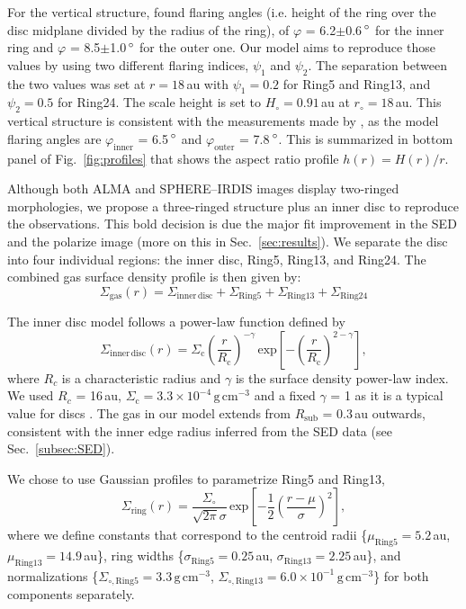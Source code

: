 \documentclass[fleqn,usenatbib,useAMS]{mnras}
\begin{document}
For the vertical structure, \citet{dOrazi} found flaring angles (i.e. height of the ring over the disc midplane divided by the radius of the ring), of $\varphi$ = 6.2$\pm$0.6\,$\hbox{$^\circ$}$ for the inner ring and $\varphi$ = 8.5$\pm$1.0\,$\hbox{$^\circ$}$ for the outer one. Our model aims to reproduce those values by using two different flaring indices, $\psi_1$ and $\psi_2$. The separation between the two values was set at $r = 18$\,au with $\psi_1=0.2$ for Ring5 and Ring13, and $\psi_2=0.5$ for Ring24. The scale height is set to $H_\circ = 0.91$\,au at $r_\circ = 18$\,au. This vertical structure is consistent with the measurements made by \citet{dOrazi}, as the model flaring angles are $\varphi_{\mathrm{inner}}$ = 6.5\,$\hbox{$^\circ$}$ and $\varphi_{\mathrm{outer}}$ = 7.8\,$\hbox{$^\circ$}$. This is summarized in bottom panel of Fig.~\ref{fig:profiles} that shows the aspect ratio profile $h(r)=H(r)/r$.

Although both ALMA and SPHERE--IRDIS images display two-ringed morphologies, we propose a three-ringed structure plus an inner disc to reproduce the observations. This bold decision is due the major fit improvement in the SED and the polarize image (more on this in Sec.~\ref{sec:results}). We separate the disc into four individual regions: the inner disc, Ring5, Ring13, and Ring24. The combined gas surface density profile is then given by:
\begin{equation}
  \Sigma_{\mathrm{gas}}(r) = \Sigma_{\mathrm{inner\,disc}} + \Sigma_{\mathrm{Ring5}} + \Sigma_{\mathrm{Ring13}} + \Sigma_{\mathrm{Ring24}}
\end{equation}

The inner disc model follows a power-law function defined by
\begin{equation}
  \Sigma_{\mathrm{inner\,disc}}(r) =\Sigma_\mathrm{c} \left(\frac{r}{R_\mathrm{c}}\right)^{-\gamma}  \, \mathrm{exp}\left[-\left(\frac{r}{R_\mathrm{c}}\right)^{2-\gamma}\right],
\end{equation}
where $R_c$ is a characteristic radius and $\gamma$ is the surface density power-law index. We used $R_c$ = 16\,au, $\Sigma_\mathrm{c} =3.3\times10^{-4}$\,$\mathrm{g\,cm^{-3}}$ and a fixed $\gamma$ = 1 as it is a typical value for discs \citep{Andrews_2009,Andrews_2010}. The gas in our model extends from $R_{\mathrm{sub}}$ = 0.3\,au outwards, consistent with the inner edge radius inferred from the SED data (see Sec.~\ref{subsec:SED}).

We chose to use Gaussian profiles to parametrize Ring5 and Ring13,
\begin{equation}
  \Sigma_{\mathrm{ring}}(r) = \frac{\Sigma_\circ}{\sqrt{2 \pi} \sigma}
  \, \mathrm{exp}\left[-\frac{1}{2}\left(\frac{r-\mu}{\sigma}\right)^{2}\right],
\end{equation}
where we define constants that correspond to the centroid radii \{$\mu_{\mathrm{Ring5}}=5.2$\,au, $\mu_{\mathrm{Ring13}}=14.9$\,au\}, ring widths \{$\sigma_{\mathrm{Ring5}}=0.25$\,au, $\sigma_{\mathrm{Ring13}}=2.25$\,au\}, and normalizations \{$\Sigma_{\circ,\mathrm{Ring5}}=3.3$\,$\mathrm{g\,cm^{-3}}$, $\Sigma_{\circ,\mathrm{Ring13}}=6.0 \times 10^{-1}$\,$\mathrm{g\,cm^{-3}}$\} for both components separately.
\end{document}
